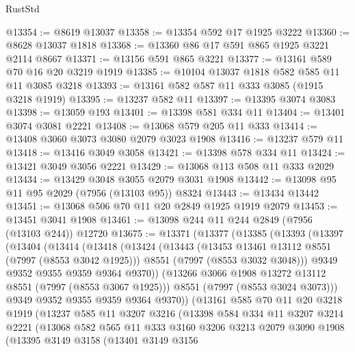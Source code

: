 \begin{lexlean}{RustStd}
\begin{coremodule}
{\begin{coremodule}
{{{{{{{{{{{{{{{{{{{{{{{{{{{{{{{{{{{{{{{{{{{@13354 := @8619 @13037
@13358 := @13354 @592 @17 @1925 @3222
@13360 := @8628 @13037 @1818
@13368 := @13360 @86 @17 @591 @865 @1925 @3221 @2114 @8667
@13371 := @13156 @591 @865 @3221
@13377 := @13161 @589 @70 @16 @20 @3219 @1919
@13385 := @10104 @13037 @1818 @582 @585 @11 @11 @3085 @3218
@13393 := @13161 @582 @587 @11 @333 @3085 (@1915 @3218 @1919)
@13395 := @13237 @582 @11
@13397 := @13395 @3074 @3083
@13398 := @13059 @193
@13401 := @13398 @581 @334 @11
@13404 := @13401 @3074 @3081 @2221
@13408 := @13068 @579 @205 @11 @333
@13414 := @13408 @3060 @3073 @3080 @2079 @3023 @1908
@13416 := @13237 @579 @11
@13418 := @13416 @3049 @3058
@13421 := @13398 @578 @334 @11
@13424 := @13421 @3049 @3056 @2221
@13429 := @13068 @113 @508 @11 @333 @2029
@13434 := @13429 @3048 @3055 @2079 @3031 @1908
@13442 := @13098 @95 @11 @95 @2029 (@7956 (@13103 @95)) @8324
@13443 := @13434 @13442
@13451 := @13068 @506 @70 @11 @20 @2849 @1925 @1919 @2079
@13453 := @13451 @3041 @1908
@13461 := @13098 @244 @11 @244 @2849 (@7956 (@13103 @244)) @12720
@13675 := @13371
    (@13377
      (@13385
        (@13393
          (@13397
            (@13404
              (@13414
                (@13418
                  (@13424
                    (@13443
                      (@13453 @13461 @13112 @8551 (@7997 (@8553 @3042 @1925)))
                      @8551
                      (@7997 (@8553 @3032 @3048)))
                    @9349
                    @9352
                    @9355
                    @9359
                    @9364
                    @9370))
                (@13266 @3066 @1908 @13272 @13112 @8551 (@7997 (@8553 @3067 @1925)))
                @8551
                (@7997 (@8553 @3024 @3073)))
              @9349
              @9352
              @9355
              @9359
              @9364
              @9370))
          (@13161
            @585
            @70
            @11
            @20
            @3218
            @1919
            (@13237
              @585
              @11
              @3207
              @3216
              (@13398
                @584
                @334
                @11
                @3207
                @3214
                @2221
                (@13068
                  @582
                  @565
                  @11
                  @333
                  @3160
                  @3206
                  @3213
                  @2079
                  @3090
                  @1908
                  (@13395
                    @3149
                    @3158
                    (@13401
                      @3149
                      @3156
}}}}}}}}}}}}}}}}}}}}}}}}}}}}}}}}}}}}}}}}}}}
\end{coremodule}}
\end{coremodule}
\end{lexlean}
